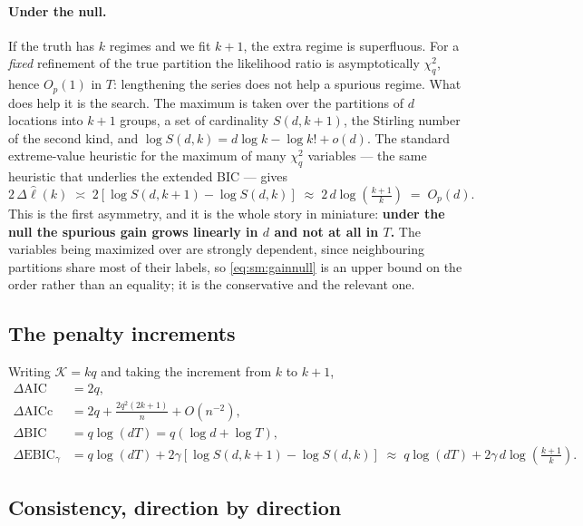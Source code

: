 \documentclass[11pt]{article}
\begin{document}
\paragraph{Under the null.} If the truth has $k$ regimes and we fit $k+1$, the extra regime is superfluous. For a \emph{fixed} refinement of the true partition the likelihood ratio is asymptotically $\chi^2_q$, hence $O_p(1)$ in $T$: lengthening the series does not help a spurious regime. What does help it is the search. The maximum is taken over the partitions of $d$ locations into $k+1$ groups, a set of cardinality $S(d, k+1)$, the Stirling number of the second kind, and $\log S(d,k) = d\log k - \log k! + o(d)$. The standard extreme-value heuristic for the maximum of many $\chi^2_q$ variables --- the same heuristic that underlies the extended BIC --- gives
\begin{equation}\label{eq:sm:gainnull}
  2\,\Delta\hat\ell(k) \;\asymp\; 2\left[\log S(d,k+1) - \log S(d,k)\right]
  \;\approx\; 2\,d \log\!\left(\tfrac{k+1}{k}\right) \;=\; O_p(d).
\end{equation}
This is the first asymmetry, and it is the whole story in miniature: \textbf{under the null the spurious gain grows linearly in $d$ and not at all in $T$.} The variables being maximized over are strongly dependent, since neighbouring partitions share most of their labels, so \eqref{eq:sm:gainnull} is an upper bound on the order rather than an equality; it is the conservative and the relevant one.

\subsection{The penalty increments}

Writing $\mathcal{K} = kq$ and taking the increment from $k$ to $k+1$,
\begin{align}
  \Delta\mathrm{AIC}  &= 2q, \label{eq:sm:aic}\\
  \Delta\mathrm{AICc} &= 2q + \frac{2q^2(2k+1)}{n} + O(n^{-2}), \label{eq:sm:aicc}\\
  \Delta\mathrm{BIC}  &= q \log(dT) = q(\log d + \log T), \label{eq:sm:bic}\\
  \Delta\mathrm{EBIC}_\gamma &= q \log(dT) + 2\gamma\left[\log S(d,k+1) - \log S(d,k)\right]
     \;\approx\; q\log(dT) + 2\gamma\, d \log\!\left(\tfrac{k+1}{k}\right). \label{eq:sm:ebic}
\end{align}

\subsection{Consistency, direction by direction}
\end{document}
